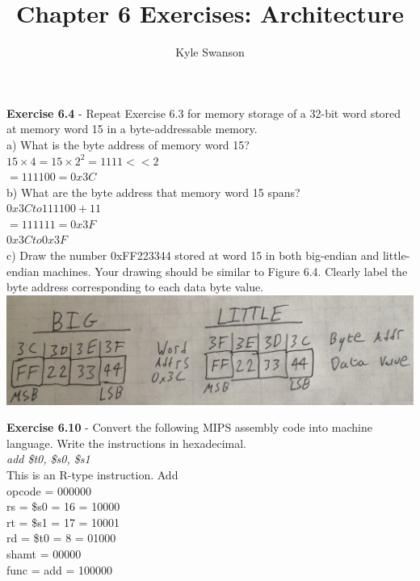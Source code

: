 \documentclass[12pt,a4paper]{report}
\author{Kyle Swanson}
\title{Chapter 6 Exercises: Architecture}
\begin{document}
\maketitle
\begin{normalsize}

\textbf{Exercise 6.4} - Repeat Exercise 6.3 for memory storage of a 32-bit word stored at memory word 15 in a byte-addressable memory. \\
a) What is the byte address of memory word 15? \\
$ 15 \times 4 = 15 \times 2^{2} = 1111 << 2 $ \\
$ = 111100 = 0x3C $ \\

b) What are the byte address that memory word 15 spans? \\
$ 0x3C to 111100 + 11 $ \\
$ = 111111 = 0x3F $ \\
$ 0x3C to 0x3F $ \\

c) Draw the number 0xFF223344 stored at word 15 in both big-endian and little-endian machines. Your drawing should be similar to Figure 6.4. Clearly label the byte address corresponding to each data byte value. \\
\includegraphics[scale=.15]{img/num} \\


\medskip

\textbf{Exercise 6.10} - Convert the following MIPS assembly code into machine language. Write the instructions in hexadecimal. \\
\textit{add \$t0, \$s0, \$s1} \\
This is an R-type instruction. Add \\
opcode = 000000 \\
rs = \$s0 = 16 = 10000 \\
rt = \$s1 = 17 = 10001 \\
rd = \$t0 = 8 = 01000 \\
shamt = 00000 \\
func = add = 100000 \\


\end{normalsize}
\end{document}
